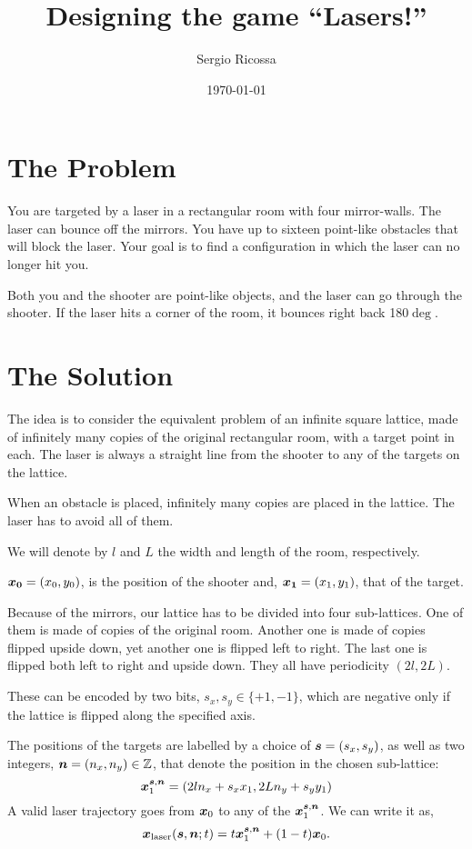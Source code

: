 \documentclass[12pt]{article}
\date{\Large{ \today}}
\author{\Large{Sergio Ricossa}}
\title{\huge{\textsf{Designing the game “Lasers!”}}}
\begin{document}
\maketitle
\tableofcontents

\section{The Problem}

You are targeted by a laser in a rectangular room with four
mirror-walls. The laser can bounce off the mirrors. You have
up to sixteen point-like obstacles that will block the
laser. Your goal is to find a configuration in which the
laser can no longer hit you.

Both you and the shooter are point-like objects, and the
laser can go through the shooter. If the laser hits a corner
of the room, it bounces right back 180$\deg$.

\section{The Solution}

The idea is to consider the equivalent problem of an
infinite square lattice, made of infinitely many copies of
the original rectangular room, with a target point in each.
The laser is always a straight line from the shooter to any
of the targets on the lattice.

When an obstacle is placed, infinitely many copies are
placed in the lattice. The laser has to avoid all of them.

We will denote by $l$ and $L$ the width and length of the
room, respectively.

$\vb*{x_0}=(x_0,y_0)$, is the position of the shooter and,
$\vb*{x_1}=(x_1,y_1)$, that of the target.

Because of the mirrors, our lattice has to be divided into
four sub-lattices. One of them is made of copies of the
original room.  Another one is made of copies flipped upside
down, yet another one is flipped left to right. The last one
is flipped both left to right and upside down. They all have
periodicity $(2l,2L)$.

These can be encoded by two bits, $s_x, s_y\in\{+1,-1\}$,
which are negative only if the lattice is flipped along the
specified axis.

The positions of the targets are labelled by a choice of
$\vb*{s}=(s_x,s_y)$, as well as two integers,
$\vb*{n}=(n_x,n_y)\in\mathbb{Z}$, that denote the position
in the chosen sub-lattice:
\begin{equation}
    \vb*{x}_1^{\vb*{s},\vb*{n}}=(2ln_x + s_xx_1, 2Ln_y + s_yy_1)
\end{equation}
A valid laser trajectory goes from $\vb*{x}_0$ to any of the
$\vb*{x}_1^{\vb*{s}, \vb*{n}}$. We can write it as,
\begin{equation}
    \vb*{x}_\text{laser}(\vb*{s}, \vb*{n}; t) =
        t\vb*{x}_1^{\vb*{s}, \vb*{n}} + (1-t)\vb*{x}_0.
\end{equation}
\end{document}
